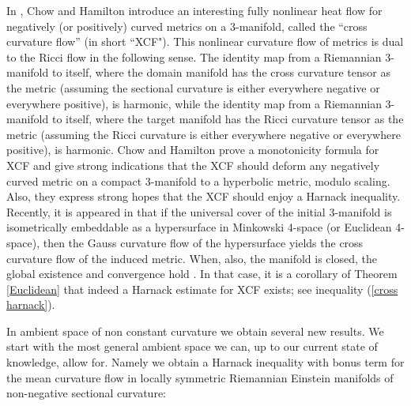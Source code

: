 In \cite{ChowHamilton:/2004}, Chow and Hamilton introduce an interesting fully nonlinear heat flow for negatively (or positively) curved metrics on a 3-manifold, called the ``cross curvature flow'' (in short ``XCF"). This nonlinear curvature flow of metrics is dual to the Ricci flow in the following sense. The identity map from a Riemannian 3-manifold to itself, where the domain manifold has the cross curvature tensor as the metric (assuming the sectional curvature is either everywhere negative or everywhere positive), is harmonic, while the identity map from a Riemannian 3-manifold to itself, where the target manifold has the  Ricci curvature tensor as the metric (assuming the Ricci curvature is either everywhere negative or everywhere positive), is harmonic. Chow and Hamilton prove a monotonicity formula for XCF and give strong indications that the XCF should deform any negatively curved metric on a compact 3-manifold to a hyperbolic metric, modulo scaling. Also, they express strong hopes that the XCF should enjoy a Harnack inequality. Recently, it is appeared in \cite{AndrewsChenFangMcCoy:/2015} that if the universal cover of the initial 3-manifold is isometrically embeddable as a hypersurface in Minkowski 4-space (or Euclidean 4-space), then the Gauss curvature flow of the hypersurface yields the cross curvature flow of the induced metric. When, also, the manifold is closed, the global existence and convergence hold \cite{AndrewsChenFangMcCoy:/2015}. In that case, it is a corollary of Theorem \ref{Euclidean} that indeed a Harnack estimate for XCF exists; see inequality (\ref{cross harnack}).

In ambient space of non constant curvature we obtain several new results. We start with the most general ambient space we can, up to our current state of knowledge, allow for. Namely we obtain a Harnack inequality with bonus term for the mean curvature flow in locally symmetric Riemannian Einstein manifolds of non-negative sectional curvature:

